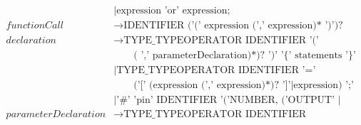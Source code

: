 \begin{align*}
                            & \mid \text{expression 'or' expression;}                                             \\
    functionCall            & \to \text{IDENTIFIER ('(' expression (',' expression)* ')')?}                       \\
    declaration             & \to \text{TYPE\_TYPEOPERATOR IDENTIFIER '(' (parameterDeclaration}                  \\
                            & \qquad \text{( ',' parameterDeclaration)*)? ')' '\{' statements '\}'}               \\
                            & \mid \text{TYPE\_TYPEOPERATOR IDENTIFIER '='}                                       \\
                            & \qquad \text{('[' (expression (',' expression)*)? ']'} \mid \text{expression) ';'}  \\
                            & \mid \text{'\#' 'pin' IDENTIFIER '('NUMBER, ('OUTPUT' | 'INPUT' )')'}                   \\ %
    parameterDeclaration    & \to \text{TYPE\_TYPEOPERATOR IDENTIFIER}
\end{align*}

